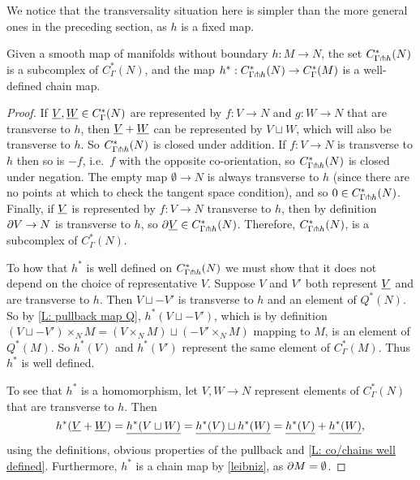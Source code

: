 We notice that the transversality situation here is simpler than the more general ones in the preceding section, as $h$ is a fixed map.

\begin{proposition}
	Given a smooth map of manifolds without boundary $h \colon M \to N$, the set $C^*_{\Gamma \pitchfork h}(N)$ is a subcomplex of $C^*_{\Gamma}(N)$, and the map $h^*:C^*_{\Gamma \pitchfork h}(N) \to C^*_{\Gamma}(M)$ is a well-defined chain map.
\end{proposition}

\begin{proof}
	If $\underline{V},\underline{W} \in C^*_\Gamma(N)$ are represented by $f \colon V \to N$ and $g \colon W \to N$ that are transverse to $h$, then $\underline{V}+\underline{W}$ can be represented by $V \sqcup W$, which will also be transverse to $h$.
	So $C^*_{\Gamma \pitchfork h}(N)$ is closed under addition.
	If $f \colon V \to N$ is transverse to $h$ then so is $-f$, i.e.\ $f$ with the opposite co-orientation, so $C^*_{\Gamma \pitchfork h}(N)$ is closed under negation.
	The empty map $\emptyset \to N$ is always transverse to $h$ (since there are no points at which to check the tangent space condition), and so $0 \in C^*_{\Gamma \pitchfork h}(N)$.
	Finally, if $\underline{V}$ is represented by $f \colon V \to N$ transverse to $h$, then by definition $\partial V \to N$ is transverse to $h$, so $\partial \underline{V} \in C^*_{\Gamma \pitchfork h}(N)$.
	Therefore, $C^*_{\Gamma \pitchfork h}(N)$, is a subcomplex of $C^*_{\Gamma}(N)$.

	To how that $h^*$ is well defined on $C^*_{\Gamma \pitchfork h}(N)$ we must show that it does not depend on the choice of representative $V$.
	Suppose $V$ and $V'$ both represent $\underline{V}$ and are transverse to $h$.
	Then $V \sqcup -V'$ is transverse to $h$ and an element of $Q^*(N)$.
	So by \cref{L: pullback map Q}, $h^*(V \sqcup -V')$, which is by definition $(V \sqcup -V') \times_N M = (V \times_N M) \sqcup (-V' \times_N M)$ mapping to $M$, is an element of $Q^*(M)$.
	So $h^*(V)$ and $h^*(V')$ represent the same element of $C^*_{\Gamma}(M)$.
	Thus $h^*$ is well defined.

	To see that $h^*$ is a homomorphism, let $V,W \to N$ represent elements of $C^*_{\Gamma}(N)$ that are transverse to $h$.
	Then
	$$h^*(\underline{V}+\underline{W}) = \underline{h^*(V \sqcup W)} = \underline{h^*(V) \sqcup h^*(W)} = \underline{h^*(V)}+\underline{h^*(W)},$$
	using the definitions, obvious properties of the pullback and \cref{L: co/chains well defined}.
	Furthermore, $h^*$ is a chain map by \cref{leibniz}, as $\partial M = \emptyset$.
\end{proof}

